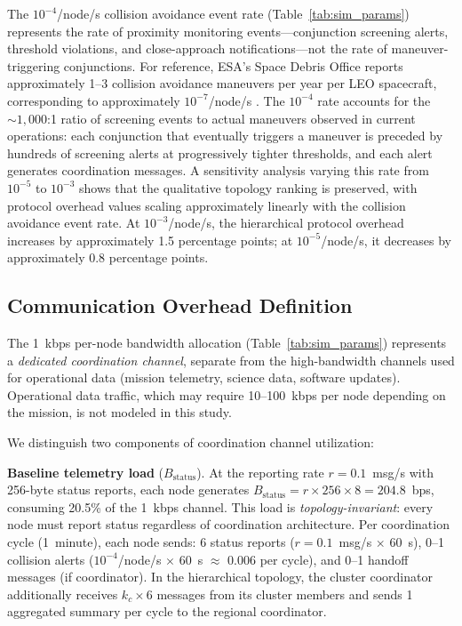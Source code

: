 \documentclass[journal]{IEEEtran}
\begin{document}
The $10^{-4}$/node/s collision avoidance event rate (Table~\ref{tab:sim_params}) represents the rate of proximity monitoring events---conjunction screening alerts, threshold violations, and close-approach notifications---not the rate of maneuver-triggering conjunctions. For reference, ESA's Space Debris Office reports approximately 1--3 collision avoidance maneuvers per year per LEO spacecraft, corresponding to approximately $10^{-7}$/node/s \cite{esa_space_env}. The $10^{-4}$ rate accounts for the ${\sim}1{,}000$:1 ratio of screening events to actual maneuvers observed in current operations: each conjunction that eventually triggers a maneuver is preceded by hundreds of screening alerts at progressively tighter thresholds, and each alert generates coordination messages. A sensitivity analysis varying this rate from $10^{-5}$ to $10^{-3}$ shows that the qualitative topology ranking is preserved, with protocol overhead values scaling approximately linearly with the collision avoidance event rate. At $10^{-3}$/node/s, the hierarchical protocol overhead increases by approximately 1.5 percentage points; at $10^{-5}$/node/s, it decreases by approximately 0.8 percentage points.

\subsection{Communication Overhead Definition}

The 1~kbps per-node bandwidth allocation (Table~\ref{tab:sim_params}) represents a \emph{dedicated coordination channel}, separate from the high-bandwidth channels used for operational data (mission telemetry, science data, software updates). Operational data traffic, which may require 10--100~kbps per node depending on the mission, is not modeled in this study.

We distinguish two components of coordination channel utilization:

\textbf{Baseline telemetry load} ($B_{\text{status}}$). At the reporting rate $r = 0.1$~msg/s with 256-byte status reports, each node generates $B_{\text{status}} = r \times 256 \times 8 = 204.8$~bps, consuming 20.5\% of the 1~kbps channel. This load is \emph{topology-invariant}: every node must report status regardless of coordination architecture. Per coordination cycle (1~minute), each node sends: 6 status reports ($r = 0.1$~msg/s $\times$ 60~s), 0--1 collision alerts ($10^{-4}$/node/s $\times$ 60~s $\approx$ 0.006 per cycle), and 0--1 handoff messages (if coordinator). In the hierarchical topology, the cluster coordinator additionally receives $k_c \times 6$ messages from its cluster members and sends 1 aggregated summary per cycle to the regional coordinator.
\end{document}
